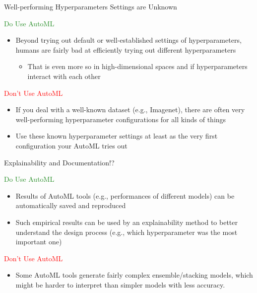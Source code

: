 \documentclass[main]{subfiles}
\begin{document}
\begin{frame}[c]{Well-performing Hyperparameters Settings are Unknown}

\textcolor{ForestGreen}{Do Use AutoML}
\begin{itemize}
    \item Beyond trying out default or well-established settings of hyperparameters, humans are fairly bad at efficiently trying out different hyperparameters
    \begin{itemize}
        \item That is even more so in high-dimensional spaces and if hyperparameters interact with each other
    \end{itemize}
\end{itemize}

\pause

\textcolor{Red}{Don't Use AutoML}

\begin{itemize}
    \item If you deal with a well-known dataset (e.g., Imagenet), there are often very well-performing hyperparameter configurations for all kinds of things
    \item[$\leadsto$] Use these known hyperparameter settings  at least as the very first configuration your AutoML tries out
\end{itemize}

\end{frame}
\begin{frame}[c]{Explainability and Documentation!?}

\textcolor{ForestGreen}{Do Use AutoML}
\begin{itemize}
    \item Results of AutoML tools (e.g., performances of different models) can be automatically saved and reproduced
    \item Such empirical results can be used by an explainability method to better understand the design process (e.g., which hyperparameter was the most important one)
\end{itemize}

\pause

\textcolor{Red}{Don't Use AutoML}

\begin{itemize}
    \item Some AutoML tools generate fairly complex ensemble/stacking models, which might be harder to interpret than simpler models with less accuracy.
\end{itemize}

\end{frame}
\end{document}
